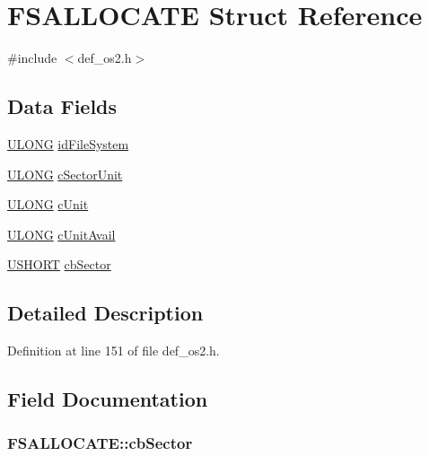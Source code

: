 \hypertarget{structFSALLOCATE}{\section{F\+S\+A\+L\+L\+O\+C\+A\+T\+E Struct Reference}
\label{structFSALLOCATE}
}


{\ttfamily \#include $<$def\+\_\+os2.\+h$>$}

\subsection*{Data Fields}
\begin{DoxyCompactItemize}
\item 
\hyperlink{def__os2_8h_af632da489ebc3708ec3ab6791ee53fa4}{U\+L\+O\+N\+G} \hyperlink{structFSALLOCATE_a44c4c2a607e6e46647c9bb5ebc577cd8}{id\+File\+System}
\item 
\hyperlink{def__os2_8h_af632da489ebc3708ec3ab6791ee53fa4}{U\+L\+O\+N\+G} \hyperlink{structFSALLOCATE_af730984fe2d62ec64a6dfcfe5b3d3973}{c\+Sector\+Unit}
\item 
\hyperlink{def__os2_8h_af632da489ebc3708ec3ab6791ee53fa4}{U\+L\+O\+N\+G} \hyperlink{structFSALLOCATE_a54483152185caa1454bb7c769234d472}{c\+Unit}
\item 
\hyperlink{def__os2_8h_af632da489ebc3708ec3ab6791ee53fa4}{U\+L\+O\+N\+G} \hyperlink{structFSALLOCATE_af5e6fd53d8768376a2f922203dfb77cd}{c\+Unit\+Avail}
\item 
\hyperlink{def__os2_8h_a5850d5316caf7f4cedd742fdf8cd7c02}{U\+S\+H\+O\+R\+T} \hyperlink{structFSALLOCATE_a24eea7d05831b95f8402bf38f21a8e89}{cb\+Sector}
\end{DoxyCompactItemize}


\subsection{Detailed Description}


Definition at line 151 of file def\+\_\+os2.\+h.



\subsection{Field Documentation}
\hypertarget{structFSALLOCATE_a24eea7d05831b95f8402bf38f21a8e89}{
\subsubsection[{cb\+Sector}]{ F\+S\+A\+L\+L\+O\+C\+A\+T\+E\+::cb\+Sector}}\label{structFSALLOCATE_a24eea7d05831b95f8402bf38f21a8e89}


